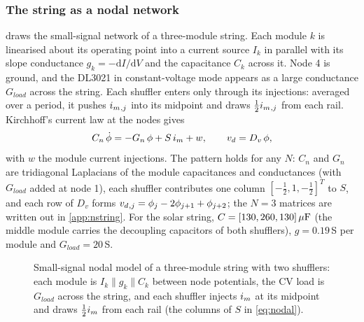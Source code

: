 \subsubsection*{The string as a nodal network}
 draws the small-signal network of a three-module string. Each module $k$ is linearised about its operating point into a current source $I_k$ in parallel with its slope conductance $g_k = -\mathrm{d}I/\mathrm{d}V$ and the capacitance $C_k$ across it. Node 4 is ground, and the DL3021 in constant-voltage mode appears as a large conductance $G_{load}$ across the string. Each shuffler enters only through its injections: averaged over a period, it pushes $i_{m}{}_{,j}$ into its midpoint and draws $\tfrac12i_{m}{}_{,j}$ from each rail. Kirchhoff's current law at the nodes gives
\begin{equation}
  C_n\,\dot\phi = -G_n\,\phi + S\,i_{m} + w, \qquad v_{d} = D_v\,\phi, \label{eq:nodal}
\end{equation}
with $w$ the module current injections. The pattern holds for any $N$: $C_n$ and $G_n$ are tridiagonal Laplacians of the module capacitances and conductances (with $G_{load}$ added at node 1), each shuffler contributes one column $[-\tfrac12, 1, -\tfrac12]^T$ to $S$, and each row of $D_v$ forms $v_{d}{}_{,j} = \phi_j - 2\phi_{j+1} + \phi_{j+2}$; the $N=3$ matrices are written out in \cref{app:nstring}. For the solar string, $C = [130, 260, 130]\,\mu\mathrm{F}$ (the middle module carries the decoupling capacitors of both shufflers), $g = 0.19$\,S per module and $G_{load} = 20$\,S.

\begin{figure}[htbp]
  \centering
  
  \caption[{Small-signal nodal model of a three-module string with two shufflers}]{Small-signal nodal model of a three-module string with two shufflers: each module is $I_k \parallel g_k \parallel C_k$ between node potentials, the CV load is $G_{load}$ across the string, and each shuffler injects $i_{m}$ at its midpoint and draws $\tfrac12i_{m}$ from each rail (the columns of $S$ in \cref{eq:nodal}).}
  \label{fig:nodal}
\end{figure}

